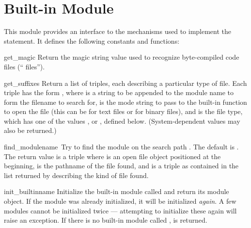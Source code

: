 \section{Built-in Module }

This module provides an interface to the mechanisms used to implement
the  statement.  It defines the following constants and
functions:

\renewcommand{\indexsubitem}{(in module struct)}

\begin{funcdesc}{get_magic}{}
Return the magic string value used to recognize byte-compiled code
files (`` files'').
\end{funcdesc}

\begin{funcdesc}{get_suffixes}{}
Return a list of triples, each describing a particular type of file.
Each triple has the form , where  is a string to be appended to the
module name to form the filename to search for,  is the mode
string to pass to the built-in  function to open the file
(this can be  for text files or  for binary
files), and  is the file type, which has one of the values
,  or , defined
below.  (System-dependent values may also be returned.)
\end{funcdesc}

\begin{funcdesc}{find_module}{name\, }
Try to find the module  on the search path .  The
default  is .  The return value is a triple
 where
 is an open file object positioned at the beginning,
 is the pathname of the
file found, and  is a triple as contained in the list
returned by  describing the kind of file found.
\end{funcdesc}

\begin{funcdesc}{init_builtin}{name}
Initialize the built-in module called  and return its module
object.  If the module was already initialized, it will be initialized
{\em again}.  A few modules cannot be initialized twice --- attempting
to initialize these again will raise an  exception.
If there is no
built-in module called ,  is returned.
\end{funcdesc}

